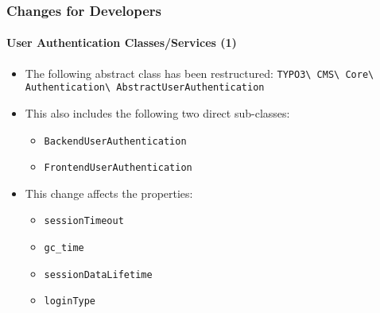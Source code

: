 
\begin{frame}[fragile]
	\frametitle{Changes for Developers}
	\framesubtitle{User Authentication Classes/Services (1)}

	\begin{itemize}
		\item The following abstract class has been restructured:\newline
			\small\texttt{TYPO3\textbackslash
				CMS\textbackslash
				Core\textbackslash
				Authentication\textbackslash
				AbstractUserAuthentication}\normalsize
		\item This also includes the following two direct sub-classes:

			\begin{itemize}
				\item \texttt{BackendUserAuthentication}
				\item \texttt{FrontendUserAuthentication}
			\end{itemize}

		\item This change affects the properties:

			\begin{itemize}
				\item \texttt{sessionTimeout}
				\item \texttt{gc\_time}
				\item \texttt{sessionDataLifetime}
				\item \texttt{loginType}
			\end{itemize}

	\end{itemize}

\end{frame}


